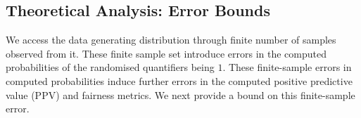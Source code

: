 \begin{comment}
\red{Let $ \bool_i $ and $ \bool_j $ be two Boolean (non-sensitive) features and we want to encode their pair-wise correlation in {\justicia}. For an assignment to $ \bool_i, \bool_j $, we consider a new Boolean variable $ v $ and add a constraint $ v \leftrightarrow \bool_i \wedge \bool_j $ in the CNF $ \phi $ of the SSAT formula $ \Phi $. Additionally, $ v $ is given a randomized quantification in the prefix of $ \Phi $ and the probability of $ v $ is calculated as the probability of both $ \bool_i $ and $ \bool_j $ assigning to $ 1 $ in the distribution $ \mathcal{D} $. Note that, to encode the total correlation of all Boolean features, the mentioned approach introduces exponentially (with the number of features) many new variables and add an exponential number of constraints to $ \phi $ with an aim of computing a more precise satisfying probability of $ \Phi $. Optionally, one can encode the correlation among a selected set of features of interest in {\justicia}. }
\end{comment}


\subsection{Theoretical Analysis: Error Bounds}\label{fairness_justicia_sec:theory}
We access the data generating distribution through  finite number of samples observed from it. These finite sample set introduce errors in the computed probabilities of the randomised quantifiers being $1$. These finite-sample errors in computed probabilities induce further errors in the computed positive predictive value (PPV) and fairness metrics. We next provide a bound on this finite-sample error.

